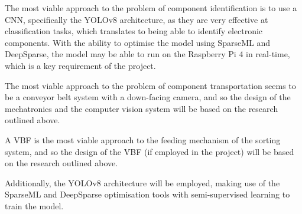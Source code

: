 The most viable approach to the problem of component identification is to use a CNN, specifically the YOLOv8 architecture, as they are very effective at classification tasks, which translates to being able to identify electronic components. With the ability
to optimise the model using SparseML and DeepSparse, the model may be able to run on the Raspberry Pi 4 in real-time, which is a key requirement of the project.

The most viable approach to the problem of component transportation seems to be a conveyor belt system with a down-facing camera, and so the design of the mechatronics and the computer vision system will be based on the research outlined above.

A VBF is the most viable approach to the feeding mechanism of the sorting system, and so the design of the VBF (if employed in the project) will be based on the research outlined above.

Additionally, the YOLOv8 architecture will be employed, making use of the SparseML and DeepSparse optimisation tools with semi-supervised learning to train the model.
